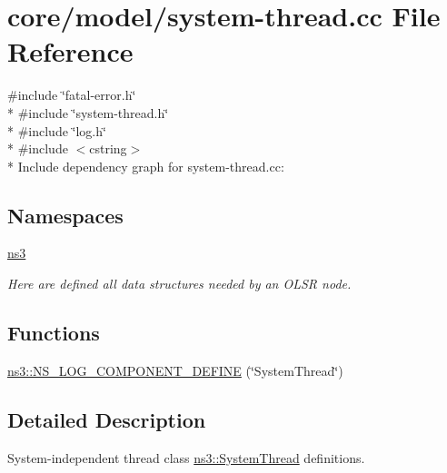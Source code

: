 \hypertarget{system-thread_8cc}{}\section{core/model/system-\/thread.cc File Reference}
\label{system-thread_8cc}
{\ttfamily \#include \char`\"{}fatal-\/error.\+h\char`\"{}}\\*
{\ttfamily \#include \char`\"{}system-\/thread.\+h\char`\"{}}\\*
{\ttfamily \#include \char`\"{}log.\+h\char`\"{}}\\*
{\ttfamily \#include $<$cstring$>$}\\*
Include dependency graph for system-\/thread.cc\+:
\subsection*{Namespaces}
\begin{DoxyCompactItemize}
\item 
 \hyperlink{namespacens3}{ns3}
\begin{DoxyCompactList}\small\item\em Here are defined all data structures needed by an O\+L\+SR node. \end{DoxyCompactList}\end{DoxyCompactItemize}
\subsection*{Functions}
\begin{DoxyCompactItemize}
\item 
\hyperlink{namespacens3_aa440a6117653574b7115c16a4e301436}{ns3\+::\+N\+S\+\_\+\+L\+O\+G\+\_\+\+C\+O\+M\+P\+O\+N\+E\+N\+T\+\_\+\+D\+E\+F\+I\+NE} (\char`\"{}System\+Thread\char`\"{})
\end{DoxyCompactItemize}


\subsection{Detailed Description}
System-\/independent thread class \hyperlink{classns3_1_1SystemThread}{ns3\+::\+System\+Thread} definitions. 